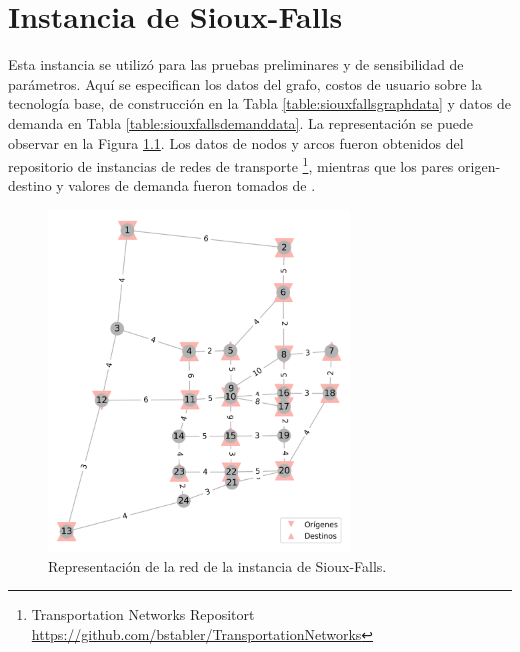 \chapter{Instancia de Sioux-Falls}
\label{sect:siouxfallsdata}

Esta instancia se utilizó para las pruebas preliminares y de sensibilidad de parámetros. Aquí se especifican los datos del grafo, costos de usuario sobre la tecnología base, de construcción en la Tabla \ref{table:siouxfallsgraphdata} y datos de demanda en Tabla \ref{table:siouxfallsdemanddata}. La representación se puede observar en la Figura \ref{fig:siouxfallsapendix}. Los datos de nodos y arcos fueron obtenidos del repositorio de instancias de redes de transporte \footnote{Transportation Networks Repositort \url{https://github.com/bstabler/TransportationNetworks}}, mientras que los pares origen-destino y valores de demanda fueron tomados de \cite{liu2019}.

\begin{figure}[h!]
\centering
\includegraphics[width=8cm]{../resources/sioux_falls_odpairs.png}
\caption{Representación de la red de la instancia de Sioux-Falls.}
\label{fig:siouxfallsapendix}
\end{figure}

